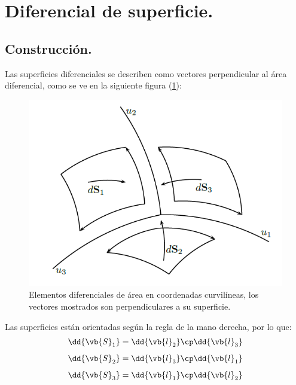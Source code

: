 \section{Diferencial de superficie.}

\subsection{Construcción.}

Las superficies diferenciales se describen como vectores perpendicular al área diferencial, como se ve en la siguiente figura (\ref{fig:figura_diferenciales_superficie}):

\begin{figure}[h!]
    \centering
    \includegraphics[scale=0.75]{Imagenes/Diferenciales_Superficie_01.png}
    \caption{Elementos diferenciales de área en coordenadas curvilíneas, los vectores mostrados son perpendiculares a su superficie.}
    \label{fig:figura_diferenciales_superficie}
\end{figure}

Las superficies están orientadas según la regla de la mano derecha, por lo que:
\begin{align*}
\dd{\vb{S}_{1}} &= \dd{\vb{l}_{2}} \cp \dd{\vb{l}_{3}} \\[0.5em] 
\dd{\vb{S}_{2}} &= \dd{\vb{l}_{3}} \cp \dd{\vb{l}_{1}} \\[0.5em]
\dd{\vb{S}_{3}} &= \dd{\vb{l}_{1}} \cp \dd{\vb{l}_{2}}
\end{align*}

